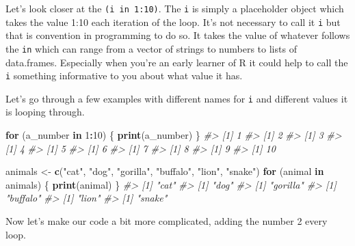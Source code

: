 \documentclass[
  12pt,
]{book}
\newenvironment{Shaded}{\begin{snugshade}}{\end{snugshade}}
\newcommand{\CommentTok}[1]{\textcolor[rgb]{0.37,0.37,0.37}{\textit{#1}}}
\newcommand{\ControlFlowTok}[1]{\textcolor[rgb]{0.27,0.27,0.27}{\textbf{#1}}}
\newcommand{\DecValTok}[1]{\textcolor[rgb]{0.06,0.06,0.06}{#1}}
\newcommand{\KeywordTok}[1]{\textcolor[rgb]{0.27,0.27,0.27}{\textbf{#1}}}
\newcommand{\NormalTok}[1]{#1}
\newcommand{\OperatorTok}[1]{\textcolor[rgb]{0.43,0.43,0.43}{\textbf{#1}}}
\newcommand{\StringTok}[1]{\textcolor[rgb]{0.5,0.5,0.5}{#1}}
\begin{document}
Let's look closer at the \texttt{(i\ in\ 1:10)}. The \texttt{i} is simply a placeholder object which takes the value 1:10 each iteration of the loop. It's not necessary to call it \texttt{i} but that is convention in programming to do so. It takes the value of whatever follows the \texttt{in} which can range from a vector of strings to numbers to lists of data.frames. Especially when you're an early learner of R it could help to call the \texttt{i} something informative to you about what value it has.

Let's go through a few examples with different names for \texttt{i} and different values it is looping through.

\begin{Shaded}
\begin{Highlighting}[]
\ControlFlowTok{for}\NormalTok{ (a\_number }\ControlFlowTok{in} \DecValTok{1}\OperatorTok{:}\DecValTok{10}\NormalTok{) \{}
   \KeywordTok{print}\NormalTok{(a\_number)}
\NormalTok{\}}
\CommentTok{\#\textgreater{} [1] 1}
\CommentTok{\#\textgreater{} [1] 2}
\CommentTok{\#\textgreater{} [1] 3}
\CommentTok{\#\textgreater{} [1] 4}
\CommentTok{\#\textgreater{} [1] 5}
\CommentTok{\#\textgreater{} [1] 6}
\CommentTok{\#\textgreater{} [1] 7}
\CommentTok{\#\textgreater{} [1] 8}
\CommentTok{\#\textgreater{} [1] 9}
\CommentTok{\#\textgreater{} [1] 10}
\end{Highlighting}
\end{Shaded}

\begin{Shaded}
\begin{Highlighting}[]
\NormalTok{animals \textless{}{-}}\StringTok{ }\KeywordTok{c}\NormalTok{(}\StringTok{"cat"}\NormalTok{, }\StringTok{"dog"}\NormalTok{, }\StringTok{"gorilla"}\NormalTok{, }\StringTok{"buffalo"}\NormalTok{, }\StringTok{"lion"}\NormalTok{, }\StringTok{"snake"}\NormalTok{)}
\ControlFlowTok{for}\NormalTok{ (animal }\ControlFlowTok{in}\NormalTok{ animals) \{}
   \KeywordTok{print}\NormalTok{(animal)}
\NormalTok{\}}
\CommentTok{\#\textgreater{} [1] "cat"}
\CommentTok{\#\textgreater{} [1] "dog"}
\CommentTok{\#\textgreater{} [1] "gorilla"}
\CommentTok{\#\textgreater{} [1] "buffalo"}
\CommentTok{\#\textgreater{} [1] "lion"}
\CommentTok{\#\textgreater{} [1] "snake"}
\end{Highlighting}
\end{Shaded}

Now let's make our code a bit more complicated, adding the number 2 every loop.
\end{document}
